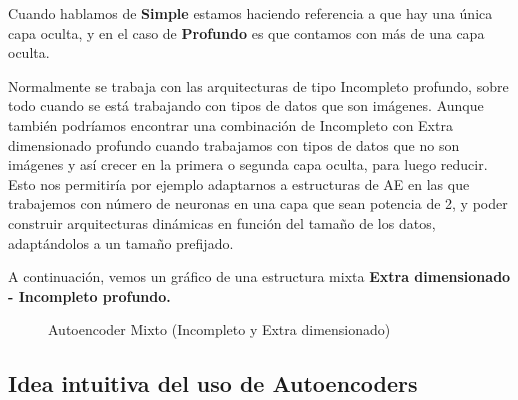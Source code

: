 \documentclass[
  a4paper,
  DIV=11,
  numbers=noendperiod]{scrreprt}
\begin{document}
Cuando hablamos de \textbf{Simple} estamos haciendo referencia a que hay
una única capa oculta, y en el caso de \textbf{Profundo} es que contamos
con más de una capa oculta.

Normalmente se trabaja con las arquitecturas de tipo Incompleto
profundo, sobre todo cuando se está trabajando con tipos de datos que
son imágenes. Aunque también podríamos encontrar una combinación de
Incompleto con Extra dimensionado profundo cuando trabajamos con tipos
de datos que no son imágenes y así crecer en la primera o segunda capa
oculta, para luego reducir. Esto nos permitiría por ejemplo adaptarnos a
estructuras de AE en las que trabajemos con número de neuronas en una
capa que sean potencia de 2, y poder construir arquitecturas dinámicas
en función del tamaño de los datos, adaptándolos a un tamaño prefijado.

A continuación, vemos un gráfico de una estructura mixta \textbf{Extra
dimensionado - Incompleto profundo.}

\begin{figure}


\caption{\label{fig-autoencoder_mixto}Autoencoder Mixto (Incompleto y
Extra dimensionado)}

\end{figure}%

\subsection{Idea intuitiva del uso de
Autoencoders}\label{idea-intuitiva-del-uso-de-autoencoders}
\end{document}
